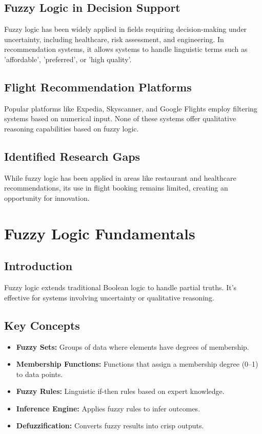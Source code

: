 \documentclass[a4paper]{article}
\begin{document}
\subsection{Fuzzy Logic in Decision Support}
Fuzzy logic has been widely applied in fields requiring decision-making under uncertainty, including healthcare, risk assessment, and engineering. In recommendation systems, it allows systems to handle linguistic terms such as 'affordable', 'preferred', or 'high quality'.

\subsection{Flight Recommendation Platforms}
Popular platforms like Expedia, Skyscanner, and Google Flights employ filtering systems based on numerical input. None of these systems offer qualitative reasoning capabilities based on fuzzy logic.

\subsection{Identified Research Gaps}
While fuzzy logic has been applied in areas like restaurant and healthcare recommendations, its use in flight booking remains limited, creating an opportunity for innovation.

\section{Fuzzy Logic Fundamentals}
\subsection{Introduction}
Fuzzy logic extends traditional Boolean logic to handle partial truths. It’s effective for systems involving uncertainty or qualitative reasoning.

\subsection{Key Concepts}
\begin{itemize}
\item \textbf{Fuzzy Sets:} Groups of data where elements have degrees of membership.
\item \textbf{Membership Functions:} Functions that assign a membership degree (0–1) to data points.
\item \textbf{Fuzzy Rules:} Linguistic if-then rules based on expert knowledge.
\item \textbf{Inference Engine:} Applies fuzzy rules to infer outcomes.
\item \textbf{Defuzzification:} Converts fuzzy results into crisp outputs.
\end{itemize}
\end{document}
